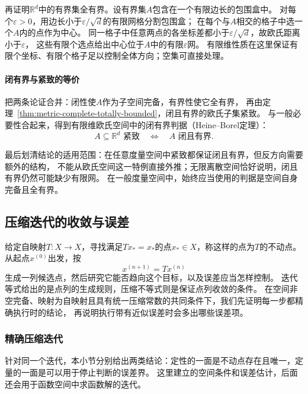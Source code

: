 再证明$\mathbb R^d$中的有界集全有界。设有界集$A$包含在一个有限边长的包围盒中。
对每个$\varepsilon>0$，用边长小于$\varepsilon/\sqrt d$的有限网格分割包围盒；
在每个与$A$相交的格子中选一个$A$内的点作为中心。
同一格子中任意两点的各坐标差都小于$\varepsilon/\sqrt d$，故欧氏距离小于$\varepsilon$，
这些有限个选点给出中心位于$A$中的有限$\varepsilon$网。
有限维性质在这里保证有限个坐标、有限个格子足以控制全体方向；空集可直接处理。

\paragraph{闭有界与紧致的等价}

把两条论证合并：闭性使$A$作为子空间完备，有界性使它全有界，
再由定理~\ref{thm:metric-complete-totally-bounded}，闭且有界的欧氏子集紧致。
与一般必要性合起来，得到有限维欧氏空间中的闭有界判据（Heine--Borel定理）：
\begin{equation}
\label{eq:metric-heine-borel}
  A\subseteq\mathbb R^d\text{ 紧致}\quad\Longleftrightarrow\quad A\text{ 闭且有界}.
\end{equation}

最后划清结论的适用范围：在任意度量空间中紧致都保证闭且有界，但反方向需要额外的结构，
不能从欧氏空间这一特例直接外推；无限离散空间恰好说明，闭且有界仍然可能缺少有限网。
在一般度量空间中，始终应当使用的判据是空间自身完备且全有界。

\subsection{压缩迭代的收敛与误差}
\label{sec:metric-contractive-solvers}

给定自映射$T:X\to X$，寻找满足$Tx_*=x_*$的点$x_*\in X$，称这样的点为$T$的不动点。
从起点$x^{(0)}$出发，按
\[
  x^{(n+1)}=Tx^{(n)}
\]
生成一列候选点，然后研究它能否趋向这个目标，以及误差应当怎样控制。
迭代等式给出的是点列的生成规则，压缩不等式则是保证点列收敛的条件。
在空间非空完备、映射为自映射且具有统一压缩常数的共同条件下，我们先证明每一步都精确执行时的结论，
再说明执行带有近似误差时会多出哪些误差项。

\subsubsection{精确压缩迭代}
\label{sec:metric-exact-contraction}

针对同一个迭代，本小节分别给出两类结论：定性的一面是不动点存在且唯一，定量的一面是可以用于停止判断的误差界。
这里建立的空间条件和误差估计，后面还会用于函数空间中求函数解的迭代。

